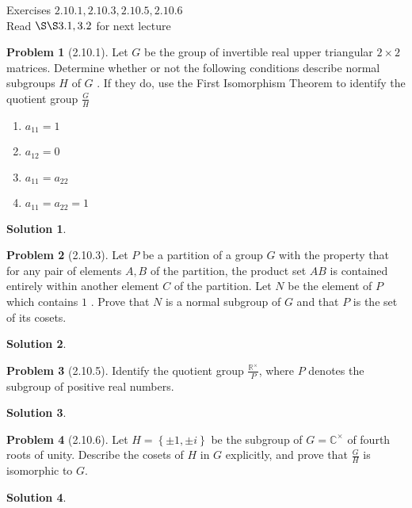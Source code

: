 \documentclass[12pt]{article}
\title{}
\author{Jerich Lee}
\date{\today}
\theoremstyle{definition} %
\newtheorem{solution}{Solution}
\newtheorem{problem}{Problem}
\theoremstyle{plain} %
\begin{document}
\maketitle
Exercises $2.10.1, 2.10.3, 2.10.5, 2.10.6$ \\
Read $\S\S 3.1, 3.2$ for next lecture 
\begin{problem}[2.10.1]
    Let $G$ be the group of invertible real upper triangular $2\times 2$ matrices. Determine whether or not the following conditions describe normal subgroups $H$ of $G$ . If they do, use the First Isomorphism Theorem to identify the quotient group $\frac{G}{H}$
    \noindent
    \begin{enumerate}
        \item $a_{11}=1 $
        \item $a_{12}=0 $
        \item $a_{11} =a_{22} $
        \item $a_{11} =a_{22} =1$    
    \end{enumerate}  
\end{problem}
\begin{solution}
    
\end{solution}
\begin{problem}[2.10.3]
   Let $P$ be a partition of a group $G$ with the property that for any pair of elements $A,B$ of the partition, the product set $AB$ is contained entirely within another element $C$ of the partition. Let $N$ be the element of $P$ which contains $1$ . Prove that $N$ is a normal subgroup of $G$ and that $P$ is the set of its cosets. 
\end{problem}
\begin{solution}
    
\end{solution}
\begin{problem}[2.10.5]
   Identify the quotient group $\frac{\mathbb{{R}}^{\times}}{P}$, where $P$ denotes the subgroup of positive real numbers.  
\end{problem}
\begin{solution}
    
\end{solution}
\begin{problem}[2.10.6]
  Let $H=\left\{ \pm 1, \pm i \right\} $  be the subgroup of $G=\mathbb{{C}}^{\times}$ of fourth roots of unity. Describe the cosets of $H$ in $G$ explicitly, and prove that $\frac{G}{H}$   is isomorphic to $G$. 
\end{problem}
\begin{solution}
    
\end{solution}
\end{document}
